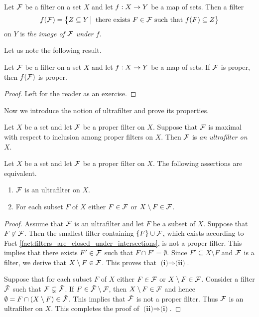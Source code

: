 \begin{definition}
	Let ${\mathcal F}$ be a filter on a set $X$ and let $f:X\rightarrow Y$ be a map of sets. Then a filter
	$$f({\mathcal F}) = \big\{Z \subseteq Y\,\big|\,\mbox{ there exists }F\in {\mathcal F}\mbox{ such that }f(F)\subseteq Z\big\}$$
	on $Y$ is \textit{the image of ${\mathcal F}$ under $f$}.
\end{definition}
\noindent
Let us note the following result.

\begin{fact}\label{fact:image_of_a_proper_filter_is_proper}
	Let ${\mathcal F}$ be a filter on a set $X$ and let $f:X\rightarrow Y$ be a map of sets. If ${\mathcal F}$ is proper, then $f({\mathcal F})$ is proper.
\end{fact}
\begin{proof}
	Left for the reader as an exercise.
\end{proof}
\noindent
Now we introduce the notion of ultrafilter and prove its properties.

\begin{definition}
	Let $X$ be a set and let ${\mathcal F}$ be a proper filter on $X$. Suppose that ${\mathcal F}$ is maximal with respect to inclusion among proper filters on $X$. Then ${\mathcal F}$ is \textit{an ultrafilter on $X$}.
\end{definition}

\begin{proposition}\label{proposition:ultrafilter_contains_either_subset_or_its_complement}
	Let $X$ be a set and let ${\mathcal F}$ be a proper filter on $X$. The following assertions are equivalent.
	\begin{enumerate}[label=\emph{\textbf{(\roman*)}}, leftmargin=*]
		\item ${\mathcal F}$ is an ultrafilter on $X$.
		\item For each subset $F$ of $X$ either $F \in {\mathcal F}$ or $X\setminus F \in {\mathcal F}$.
	\end{enumerate}
\end{proposition}
\begin{proof}
	Assume that ${\mathcal F}$ is an ultrafilter and let $F$ be a subset of $X$. Suppose that $F\not \in {\mathcal F}$. Then the smallest filter containing $\{F\}\cup {\mathcal F}$, which exists according to Fact \ref{fact:filters_are_closed_under_intersections}, is not a proper filter. This implies that there exists $F' \in {\mathcal F}$ such that $F\cap F' = \emptyset$. Since $F'\subseteq X\setminus F$ and ${\mathcal F}$ is a filter, we derive that $X\setminus F \in {\mathcal F}$. This proves that $\textbf{(i)}\Rightarrow \textbf{(ii)}$.

	Suppose that for each subset $F$ of $X$ either $F \in {\mathcal F}$ or $X\setminus F \in {\mathcal F}$. Consider a filter $\tilde{{\mathcal F}}$ such that ${\mathcal F} \subsetneq \tilde{{\mathcal F}}$. If $F \in \tilde{{\mathcal F}}\setminus {\mathcal F}$, then $X\setminus F \in {\mathcal F}$ and hence $\emptyset = F\cap \left(X\setminus F\right) \in \tilde{{\mathcal F}}$. This implies that $\tilde{{\mathcal F}}$ is not a proper filter. Thus ${\mathcal F}$ is an ultrafilter on $X$. This completes the proof of $\textbf{(ii)}\Rightarrow \textbf{(i)}$.
\end{proof}

